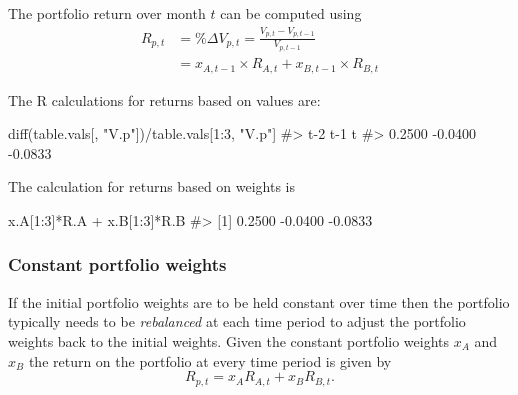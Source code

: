 \documentclass[
  letterpaper,
  DIV=11,
  numbers=noendperiod]{scrreprt}
\newenvironment{Shaded}{\begin{snugshade}}{\end{snugshade}}
\newcommand{\CommentTok}[1]{\textcolor[rgb]{0.37,0.37,0.37}{#1}}
\newcommand{\DecValTok}[1]{\textcolor[rgb]{0.68,0.00,0.00}{#1}}
\newcommand{\FunctionTok}[1]{\textcolor[rgb]{0.28,0.35,0.67}{#1}}
\newcommand{\NormalTok}[1]{\textcolor[rgb]{0.00,0.23,0.31}{#1}}
\newcommand{\SpecialCharTok}[1]{\textcolor[rgb]{0.37,0.37,0.37}{#1}}
\newcommand{\StringTok}[1]{\textcolor[rgb]{0.13,0.47,0.30}{#1}}
\theoremstyle{definition}
\theoremstyle{definition}
\theoremstyle{remark}
\begin{document}
The portfolio return over month \(t\) can be computed using
\begin{align}
R_{p,t} &= \%\Delta V_{p,t} = \frac{V_{p,t}-V_{p,t-1}}{V_{p,t-1}} \\
&= x_{A,t-1}\times R_{A,t} + x_{B,t-1}\times R_{B,t}
\end{align}

The R calculations for returns based on values are:

\begin{Shaded}
\begin{Highlighting}[]
\FunctionTok{diff}\NormalTok{(table.vals[, }\StringTok{"V.p"}\NormalTok{])}\SpecialCharTok{/}\NormalTok{table.vals[}\DecValTok{1}\SpecialCharTok{:}\DecValTok{3}\NormalTok{, }\StringTok{"V.p"}\NormalTok{]}
\CommentTok{\#\textgreater{}     t{-}2     t{-}1       t }
\CommentTok{\#\textgreater{}  0.2500 {-}0.0400 {-}0.0833}
\end{Highlighting}
\end{Shaded}

The calculation for returns based on weights is

\begin{Shaded}
\begin{Highlighting}[]
\NormalTok{x.A[}\DecValTok{1}\SpecialCharTok{:}\DecValTok{3}\NormalTok{]}\SpecialCharTok{*}\NormalTok{R.A }\SpecialCharTok{+}\NormalTok{ x.B[}\DecValTok{1}\SpecialCharTok{:}\DecValTok{3}\NormalTok{]}\SpecialCharTok{*}\NormalTok{R.B}
\CommentTok{\#\textgreater{} [1]  0.2500 {-}0.0400 {-}0.0833}
\end{Highlighting}
\end{Shaded}

\hypertarget{constant-portfolio-weights}{%
\subsubsection{Constant portfolio
weights}\label{constant-portfolio-weights}}

If the initial portfolio weights are to be held constant over time then
the portfolio typically needs to be \emph{rebalanced} at each time
period to adjust the portfolio weights back to the initial weights.
Given the constant portfolio weights \(x_A\) and \(x_B\) the return on
the portfolio at every time period is given by
\[R_{p,t} = x_A R_{A,t} + x_B R_{B,t}.\]
\end{document}
